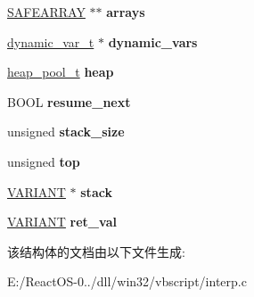 \begin{DoxyCompactItemize}
\item 
\mbox{\label{structexec__ctx__t_a2cee5fb01c10837377853222f538525e}} 
\hyperlink{structtag_s_a_f_e_a_r_r_a_y}{S\+A\+F\+E\+A\+R\+R\+AY} $\ast$$\ast$ {\bfseries arrays}
\item 
\mbox{\label{structexec__ctx__t_a71acc79f4c2fb9d55afe7400f9ccc851}} 
\hyperlink{struct__dynamic__var__t}{dynamic\+\_\+var\+\_\+t} $\ast$ {\bfseries dynamic\+\_\+vars}
\item 
\mbox{\label{structexec__ctx__t_a0794b61e25f375edf292b11c1e443233}} 
\hyperlink{structheap__pool__t}{heap\+\_\+pool\+\_\+t} {\bfseries heap}
\item 
\mbox{\label{structexec__ctx__t_afe55615598af1162ec36d6a5c870e182}} 
B\+O\+OL {\bfseries resume\+\_\+next}
\item 
\mbox{\label{structexec__ctx__t_aeb46cf82154c839731a92edf9545f168}} 
unsigned {\bfseries stack\+\_\+size}
\item 
\mbox{\label{structexec__ctx__t_aaf674a7d6f92bef2b9ec5788077f072c}} 
unsigned {\bfseries top}
\item 
\mbox{\label{structexec__ctx__t_a680e21d3a6b868efbc367459282de31f}} 
\hyperlink{structtag_v_a_r_i_a_n_t}{V\+A\+R\+I\+A\+NT} $\ast$ {\bfseries stack}
\item 
\mbox{\label{structexec__ctx__t_a30f6bfb2e863e5438fdbedc14b110617}} 
\hyperlink{structtag_v_a_r_i_a_n_t}{V\+A\+R\+I\+A\+NT} {\bfseries ret\+\_\+val}
\end{DoxyCompactItemize}


该结构体的文档由以下文件生成\+:\begin{DoxyCompactItemize}
\item 
E\+:/\+React\+O\+S-\/0../dll/win32/vbscript/interp.\+c\end{DoxyCompactItemize}
